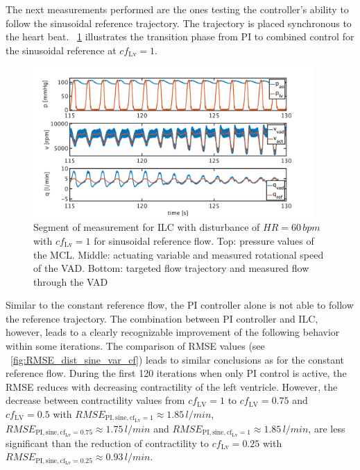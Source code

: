 The next measurements performed are the ones testing the controller's ability to follow the sinusoidal reference trajectory. The trajectory is placed synchronous to the heart beat. \figurename~\ref{fig:pi_to_ilc_dist_sine_cf1} illustrates the transition phase from PI to combined control for the sinusoidal reference at $cf_{\mathrm{Lv}}=1$.
\begin{figure}[ht!]
  \centering
  \includegraphics[width=0.95\textwidth]{images/chapt_5/ILC/pi_to_ilc_dist_sine_cf1.pdf}
  \caption[Segment of measurement for ILC with disturbance of $HR=60\,bpm$ with $cf_{\mathrm{Lv}}=1$ for sinusoidal reference flow]{Segment of measurement for ILC with disturbance of $HR=60\,bpm$ with $cf_{\mathrm{Lv}}=1$ for sinusoidal reference flow. Top:  pressure values of the MCL. Middle: actuating variable and measured rotational speed of the VAD. Bottom: targeted flow trajectory and measured flow through the VAD}
  \label{fig:pi_to_ilc_dist_sine_cf1}
\end{figure}
Similar to the constant reference flow, the PI controller alone is not able to follow the reference trajectory. The combination between PI controller and ILC, however, leads to a clearly recognizable improvement of the following behavior within some iterations.
The comparison of RMSE values (see \figurename~\ref{fig:RMSE_dist_sine_var_cf}) leads to similar conclusions as for the constant reference flow. During the first 120 iterations when only PI control is active, the RMSE reduces with decreasing contractility of the left ventricle. However, the decrease between contractility values from $cf_{\mathrm{LV}}=1$ to $cf_{\mathrm{LV}}=0.75$ and $cf_{\mathrm{LV}}=0.5$ with $RMSE_{\mathrm{PI,sine,cf_{\mathrm{Lv}}=1}}\approx 1.85\, l/min$, $RMSE_{\mathrm{PI,sine,cf_{\mathrm{Lv}}=0.75}}\approx 1.75\, l/min$ and $RMSE_{\mathrm{PI,sine,cf_{\mathrm{Lv}}=1}}\approx 1.85\, l/min$, are less significant than the reduction of contractility to $cf_{\mathrm{Lv}}=0.25$ with $RMSE_{\mathrm{PI,sine,cf_{\mathrm{Lv}}=0.25}}\approx 0.93\, l/min$.

